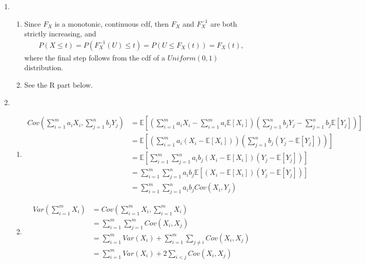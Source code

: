 \documentclass[12pt]{article}
\begin{document}
\begin{enumerate}
\item 

\begin{enumerate}
\item Since $F_X$ is a monotonic, continuous cdf, then $F_X$ and $F_X^{-1}$ are both strictly increasing, and
\begin{align*}
P(X \leq t) = P(F_X^{-1}(U) \leq t) = P(U \leq F_X(t)) = F_X(t),
\end{align*}
where the final step follows from the cdf of a $Uniform(0,1)$ distribution.

\item See the R part below.

\end{enumerate}

\item 

\begin{enumerate}
\item

\begin{align*}
Cov\left( \sum \limits_{i=1}^m a_i X_i, \sum \limits_{j=1}^n b_j Y_j \right) &= \mathbb{E}\left[ \left( \sum \limits_{i=1}^m a_i X_i - \sum \limits_{i=1}^m a_i \mathbb{E}[X_i] \right)\left(\sum \limits_{j=1}^n b_j Y_j - \sum \limits_{j=1}^n b_j \mathbb{E}[Y_j] \right) \right] \\
&= \mathbb{E}\left[ \left( \sum \limits_{i=1}^m a_i (X_i - \mathbb{E}[X_i])  \right)\left(\sum \limits_{j=1}^n b_j (Y_j - \mathbb{E}[Y_j]) \right) \right] \\
&= \mathbb{E}\left[ \sum \limits_{i=1}^m \sum \limits_{j=1}^n a_i b_j  (X_i - \mathbb{E}[X_i])(Y_j - \mathbb{E}[Y_j]) \right] \\
&= \sum \limits_{i=1}^m \sum \limits_{j=1}^n a_i b_j  \mathbb{E}\left[ (X_i - \mathbb{E}[X_i])(Y_j - \mathbb{E}[Y_j])\right] \\
&= \sum \limits_{i=1}^m \sum \limits_{j=1}^n a_i b_j  Cov(X_i, Y_j)
\end{align*}

\item 

\begin{align*}
Var \left( \sum \limits_{i=1}^m X_i \right) &= Cov \left( \sum \limits_{i=1}^m X_i, \sum \limits_{i=1}^m X_i \right) \\ 
&= \sum \limits_{i=1}^m \sum \limits_{j=1}^m Cov(X_i, X_j) \\
&= \sum \limits_{i=1}^m Var(X_i) + \sum \limits_{i=1}^m \sum \limits_{j \neq i} Cov(X_i, X_j) \\
&= \sum \limits_{i=1}^m Var(X_i) + 2 \sum \limits_{i < j} Cov(X_i, X_j)
\end{align*}
\end{enumerate}


\end{enumerate}
\end{document}
